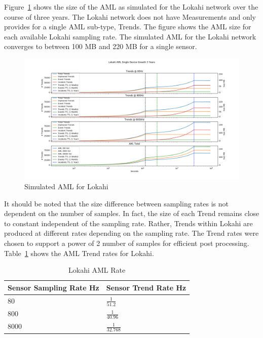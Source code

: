 Figure~\ref{fig:sim_aml_lokahi} shows the size of the AML as simulated for the Lokahi network over the course of three years. The Lokahi network does not have Measurements and only provides for a single AML sub-type, Trends. The figure shows the AML size for each available Lokahi sampling rate. The simulated AML for the Lokahi network converges to between 100 MB and 220 MB for a single sensor.

\begin{figure}[H]
	\centering
	\includegraphics[width=\linewidth]{figures/sim_aml_lokahi.png}
	\caption{Simulated AML for Lokahi}
	\label{fig:sim_aml_lokahi}
\end{figure}

It should be noted that the size difference between sampling rates is not dependent on the number of samples. In fact, the size of each Trend remains close to constant independent of the sampling rate. Rather, Trends within Lokahi are produced at different rates depending on the sampling rate. The Trend rates were chosen to support a power of 2 number of samples for efficient post processing. Table~\ref{table:lokahi_aml_rate} shows the AML Trend rates for Lokahi.

\begin{table}[H]
	\centering
	\caption{Lokahi AML Rate}
	\begin{tabularx}{\textwidth}{Xl}
		\toprule
		\textbf{Sensor Sampling Rate Hz} & \textbf{Sensor Trend Rate Hz} \\
		\midrule
		80 & $\frac{1}{51.2}$ \\
		800 & $\frac{1}{40.96}$ \\
		8000 & $\frac{1}{32.768}$ \\
		\bottomrule
	\end{tabularx}
	\label{table:lokahi_aml_rate}
\end{table}


